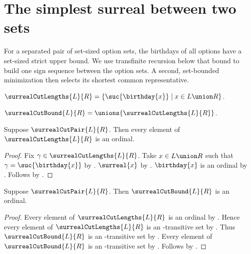 


\section{The simplest surreal between two sets}

For a separated pair of set-sized option sets, the birthdays of all options
have a set-sized strict upper bound.  We use transfinite recursion below that
bound to build one sign sequence between the option sets.  A second,
set-bounded minimization then selects its shortest common representative.

\begin{definition}\label{surreal_cut_lengths}
    $\surrealCutLengths{L}{R}=
        \{\suc{\birthday{x}}\mid x\in L\union R\}$.
\end{definition}

\begin{definition}\label{surreal_cut_bound}
    $\surrealCutBound{L}{R}=\unions{\surrealCutLengths{L}{R}}$.
\end{definition}

\begin{proposition}\label{surreal_cut_lengths_are_ordinals}
    Suppose $\surrealCutPair{L}{R}$.
    Then every element of $\surrealCutLengths{L}{R}$ is an ordinal.
\end{proposition}
\begin{proof}
    Fix $\gamma\in\surrealCutLengths{L}{R}$.
    Take $x\in L\union R$ such that
        $\gamma=\suc{\birthday{x}}$
        by .
    $\surreal{x}$ by .
    $\birthday{x}$ is an ordinal
        by .
    Follows by .
\end{proof}

\begin{proposition}\label{surreal_cut_bound_ordinal}
    Suppose $\surrealCutPair{L}{R}$.
    Then $\surrealCutBound{L}{R}$ is an ordinal.
\end{proposition}
\begin{proof}
    Every element of $\surrealCutLengths{L}{R}$ is an ordinal
        by .
    Hence every element of $\surrealCutLengths{L}{R}$ is
        an \in-transitive set by .
    Thus $\surrealCutBound{L}{R}$ is an \in-transitive set
        by .
    Every element of $\surrealCutBound{L}{R}$ is an \in-transitive set
        by .
    Follows by .
\end{proof}


